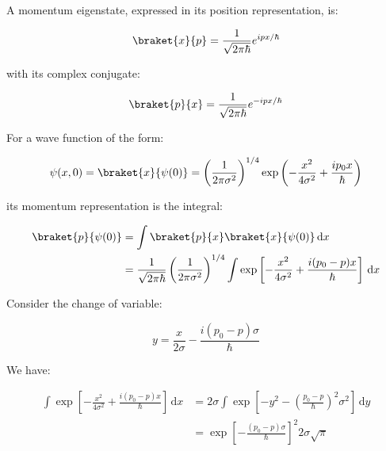 \documentclass[12pt]{article}
\begin{document}
A momentum eigenstate, expressed in its position representation, is:

\begin{equation}
    \braket{x}{p} = \frac{1}{\sqrt{2\pi\hbar}} e^{ipx/\hbar}
\end{equation}

with its complex conjugate:

\begin{equation}
    \braket{p}{x} = \frac{1}{\sqrt{2\pi\hbar}} e^{-ipx/\hbar}
\end{equation}

For a wave function of the form:

\begin{equation}
    \psi(x, 0) = \braket{x}{\psi(0)} = \left( \frac{1}{2\pi \sigma^{2}} \right)^{1/4} \exp \left( -\frac{x^{2}}{4\sigma^{2}} + \frac{ip_{0}x}{\hbar} \right)
\end{equation}

its momentum representation is the integral:

\begin{equation}
    \begin{split}
        \braket{p}{\psi(0)} &= \int \braket{p}{x} \braket{x}{\psi(0)} \, \mathrm{d}x \\
        &= \frac{1}{\sqrt{2\pi\hbar}} \left( \frac{1}{2\pi \sigma^{2}} \right)^{1/4} \int \exp \left[ -\frac{x^{2}}{4\sigma^{2}} + \frac{i(p_{0} - p)x}{\hbar} \right] \, \mathrm{d}x \\
    \end{split}
\end{equation}

Consider the change of variable:

\begin{equation}
    y = \frac{x}{2\sigma} - \frac{i(p_{0} - p)\sigma}{\hbar}
\end{equation}

We have:

\begin{equation}
    \begin{split}
        \int \exp \left[ -\frac{x^{2}}{4\sigma^{2}} + \frac{i(p_{0} - p)x}{\hbar} \right] \, \mathrm{d}x &= 2\sigma \int \exp \left[ -y^{2} - \left( \frac{p_{0} - p}{\hbar} \right)^{2} \sigma^{2} \right] \, \mathrm{d}y \\
        &= \exp \left[ -\frac{(p_{0} - p)\sigma}{\hbar} \right]^{2} 2\sigma \sqrt{\pi}
    \end{split}
\end{equation}
\end{document}
